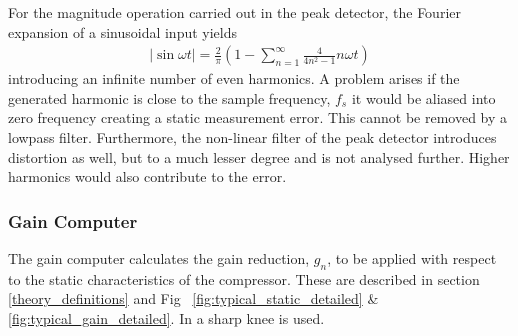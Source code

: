 \documentclass[../main2.tex]{subfiles}
\begin{document}
For the magnitude operation carried out in the peak detector, the Fourier expansion of a sinusoidal input yields
\begin{align}
\left |\sin{\omega t}\right | = \frac{2}{\pi}\left (1 - \sum_{n=1}^{\infty}\frac{4}{4n^2-1} n\omega t \right) 
\end{align}
introducing an infinite number of even harmonics. A problem arises if the generated harmonic is close to the sample frequency, $f_s$ it would be aliased into zero frequency creating a static measurement error. This cannot be removed by a lowpass filter. Furthermore, the non-linear filter of the peak detector introduces distortion as well, but to a much lesser degree\cite{mcnally1984dynamic} and is not analysed further. Higher harmonics would also contribute to the error. 
\subsubsection{Gain Computer}
The gain computer calculates the gain reduction, $g_n$, to be applied with respect to the static characteristics of the compressor. These are described in section \ref{theory_definitions} and Fig ~\ref{fig:typical_static_detailed} \& \ref{fig:typical_gain_detailed}. In \cite{mcnally1984dynamic} a sharp knee is used.
\end{document}
